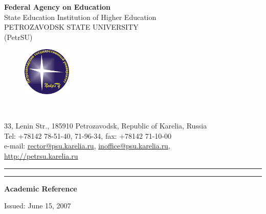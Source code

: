 \documentclass{article}
\begin{document}
\begin{center}
    {\textbf{\Large Federal Agency on Education}\\
    State Education Institution of Higher Education\\
    {\textsc PETROZAVODSK STATE UNIVERSITY}\\
    (PetrSU)}
\end{center}
    
\begin{figure}
	\includegraphics[width = 65pt]{petrsu_logo.jpg}
\end{figure}\
\begin{flushright}
	33, Lenin Str., 185910 Petrozavodsk, Republic of Karelia, Russia\\
	Tel: +78142 78-51-40, 71-96-34, fax: +78142 71-10-00\\
	e-mail: \href{mailto:rector@psu.karelia.ru}{rector@psu.karelia.ru},
	\href{mailto:inoffice@psu.karelia.ru}{inoffice@psu.karelia.ru},\\
	\href{http://petrsu.karelia.ru}{http://petrsu.karelia.ru}
\end{flushright}
\hrule
\vspace{2.5pt}
\hrule

\begin{center}
    \textbf{\large{Academic Reference}}
\end{center}

\begin{flushright}
	Issued: June 15, 2007
\end{flushright}             
\end{document}
